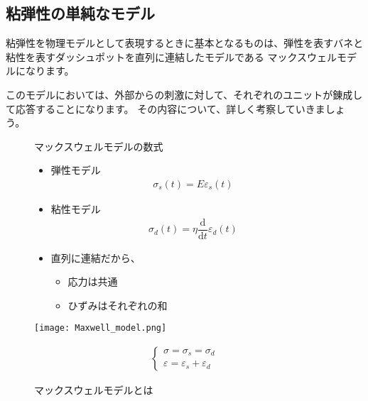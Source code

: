 \documentclass[uplatex,dvipdfmx,a4paper,11pt]{jsreport}
\begin{document}
\subsection{粘弾性の単純なモデル}
粘弾性を物理モデルとして表現するときに基本となるものは、弾性を表すバネと粘性を表すダッシュポットを直列に連結したモデルである
マックスウェルモデルになります。

このモデルにおいては、外部からの刺激に対して、それぞれのユニットが錬成して応答することになります。
その内容について、詳しく考察していきましょう。

\begin{figure}[htb]
	\begin{center}
		\begin{minipage}{0.45\textwidth}
			\begin{itembox}[l]{マックスウェルモデルの数式}
				\begin{itemize}
					\item 弾性モデル
					\begin{align*}
						\sigma_s(t) = E \varepsilon_s(t)
					\end{align*}
					\item 粘性モデル
					\begin{align*}
						\sigma_d(t) = \eta \dfrac{\mathrm{d}}{\mathrm{d}t}\varepsilon_d(t)
					\end{align*}
					\item 直列に連結だから、
					\begin{itemize}
						\item 応力は共通
					\item ひずみはそれぞれの和
					\end{itemize}
				\end{itemize}	
			\end{itembox}
		\end{minipage}
		\begin{minipage}{0.45\textwidth}
			\begin{center}
			\texttt{[image: Maxwell\_model.png]}
			\end{center}
			\begin{align*}
				\begin{cases}
					\sigma = \sigma_s = \sigma_d \\
					\varepsilon = \varepsilon_s + \varepsilon_d
				\end{cases}
			\end{align*}
		\end{minipage}
		\caption{マックスウェルモデルとは}
		\label{fig:maxwell}
	\end{center}
\end{figure}
\end{document}
